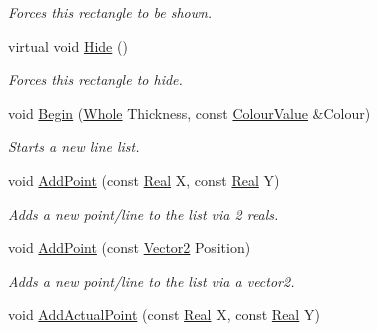\begin{DoxyCompactItemize}
\begin{DoxyCompactList}\small\item\em Forces this rectangle to be shown. \item\end{DoxyCompactList}\item 
\hypertarget{classphys_1_1UI_1_1LineList_a4e1d09adc4ed6947d93ae6030e00263e}{
virtual void \hyperlink{classphys_1_1UI_1_1LineList_a4e1d09adc4ed6947d93ae6030e00263e}{Hide} ()}
\label{d7/de8/classphys_1_1UI_1_1LineList_a4e1d09adc4ed6947d93ae6030e00263e}

\begin{DoxyCompactList}\small\item\em Forces this rectangle to hide. \item\end{DoxyCompactList}\item 
void \hyperlink{classphys_1_1UI_1_1LineList_a2f172bef99b94fa0e1d2f819b00fd8d4}{Begin} (\hyperlink{namespacephys_a460f6bc24c8dd347b05e0366ae34f34a}{Whole} Thickness, const \hyperlink{classphys_1_1ColourValue}{ColourValue} \&Colour)
\begin{DoxyCompactList}\small\item\em Starts a new line list. \item\end{DoxyCompactList}\item 
void \hyperlink{classphys_1_1UI_1_1LineList_aa7987e39f5fcf6e6351e710f1c6922ba}{AddPoint} (const \hyperlink{namespacephys_af7eb897198d265b8e868f45240230d5f}{Real} X, const \hyperlink{namespacephys_af7eb897198d265b8e868f45240230d5f}{Real} Y)
\begin{DoxyCompactList}\small\item\em Adds a new point/line to the list via 2 reals. \item\end{DoxyCompactList}\item 
void \hyperlink{classphys_1_1UI_1_1LineList_a5988b99342c7ed5d3aba5d4c33df7ed4}{AddPoint} (const \hyperlink{classphys_1_1Vector2}{Vector2} Position)
\begin{DoxyCompactList}\small\item\em Adds a new point/line to the list via a vector2. \item\end{DoxyCompactList}\item 
void \hyperlink{classphys_1_1UI_1_1LineList_a6fdb46f6c8527d994bb6f37a764e5543}{AddActualPoint} (const \hyperlink{namespacephys_af7eb897198d265b8e868f45240230d5f}{Real} X, const \hyperlink{namespacephys_af7eb897198d265b8e868f45240230d5f}{Real} Y)

\end{DoxyCompactItemize}
